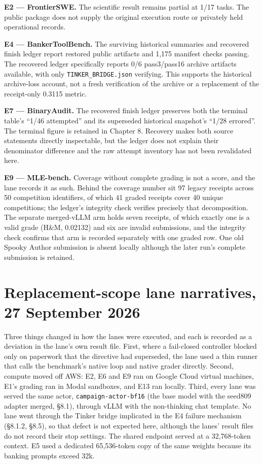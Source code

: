\documentclass[12pt,a4paper]{report}
\begin{document}
\textbf{E2 --- FrontierSWE.} The scientific result remains partial at
1/17 tasks. The public package does not supply the original execution
route or privately held operational records.

\textbf{E4 --- BankerToolBench.} The surviving historical summaries and
recovered finish ledger report restored public artifacts and 1,175
manifest checks passing. The recovered ledger specifically reports 0/6
pass3/pass16 archive artifacts available, with only
\texttt{TINKER\_BRIDGE.json} verifying. This supports the historical
archive-loss account, not a fresh verification of the archive or a
replacement of the receipt-only 0.3115 metric.

\textbf{E7 --- BinaryAudit.} The recovered finish ledger preserves both
the terminal table's ``1/46 attempted'' and its superseded historical
snapshot's ``1/28 errored''. The terminal figure is retained in Chapter
8. Recovery makes both source statements directly inspectable, but the
ledger does not explain their denominator difference and the raw attempt
inventory has not been revalidated here.

\textbf{E9 --- MLE-bench.} Coverage without complete grading is not a
score, and the lane records it as such. Behind the coverage number sit
97 legacy receipts across 50 competition identifiers, of which 41 graded
receipts cover 40 unique competitions; the ledger's integrity check
verifies precisely that decomposition. The separate merged-vLLM arm
holds seven receipts, of which exactly one is a valid grade (H\&M,
0.02132) and six are invalid submissions, and the integrity check
confirms that arm is recorded separately with one graded row. One old
Spooky Author submission is absent locally although the later run's
complete submission is retained.

\section{Replacement-scope lane narratives, 27 September
2026}\label{replacement-scope-lane-narratives-27-september-2026}

Three things changed in how the lanes were executed, and each is
recorded as a deviation in the lane's own result file. First, where a
fail-closed controller blocked only on paperwork that the directive had
superseded, the lane used a thin runner that calls the benchmark's
native loop and native grader directly. Second, compute moved off AWS:
E2, E6 and E9 ran on Google Cloud virtual machines, E1's grading ran in
Modal sandboxes, and E13 ran locally. Third, every lane was served the
same actor, \texttt{campaign-actor-bf16} (the base model with the
seed809 adapter merged, §8.1), through vLLM with the non-thinking chat
template. No lane went through the Tinker bridge implicated in the E4
failure mechanism (§8.1.2, §8.5), so that defect is not expected here,
although the lanes' result files do not record their stop settings. The
shared endpoint served at a 32,768-token context. E5 used a dedicated
65,536-token copy of the same weights because its banking prompts exceed
32k.
\end{document}
